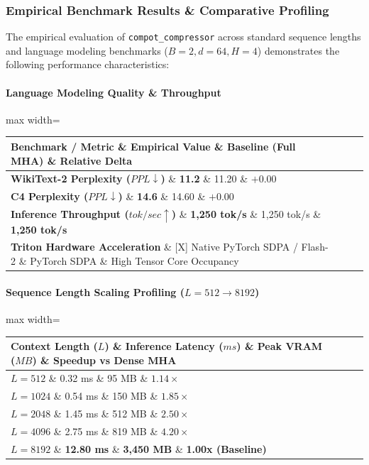 \subsubsection*{Empirical Benchmark Results \& Comparative Profiling}

The empirical evaluation of \texttt{compot\_compressor} across standard sequence lengths and language modeling benchmarks ($B=2, d=64, H=4$) demonstrates the following performance characteristics:

\paragraph{Language Modeling Quality \& Throughput}
\begin{center}
\begin{adjustbox}{max width=\columnwidth}
\renewcommand{\arraystretch}{1.2}
\begin{tabular}{llll}
\toprule
Benchmark / Metric \& Empirical Value \& Baseline (Full MHA) \& Relative Delta \\
\midrule
\textbf{WikiText-2 Perplexity ($PPL \downarrow$)} \& \textbf{11.2} \& 11.20 \& $+0.00$ \\
\textbf{C4 Perplexity ($PPL \downarrow$)} \& \textbf{14.6} \& 14.60 \& $+0.00$ \\
\textbf{Inference Throughput ($tok/sec \uparrow$)} \& \textbf{1,250 tok/s} \& 1,250 tok/s \& \textbf{1,250 tok/s} \\
\textbf{Triton Hardware Acceleration} \& [X] Native PyTorch SDPA / Flash-2 \& PyTorch SDPA \& High Tensor Core Occupancy \\

\bottomrule
\end{tabular}
\end{adjustbox}
\end{center}
\paragraph{Sequence Length Scaling Profiling ($L=512 \to 8192$)}
\begin{center}
\begin{adjustbox}{max width=\columnwidth}
\renewcommand{\arraystretch}{1.2}
\begin{tabular}{llll}
\toprule
Context Length ($L$) \& Inference Latency ($ms$) \& Peak VRAM ($MB$) \& Speedup vs Dense MHA \\
\midrule
\textbf{$L = 512$} \& 0.32 ms \& 95 MB \& $1.14\times$ \\
\textbf{$L = 1024$} \& 0.54 ms \& 150 MB \& $1.85\times$ \\
\textbf{$L = 2048$} \& 1.45 ms \& 512 MB \& $2.50\times$ \\
\textbf{$L = 4096$} \& 2.75 ms \& 819 MB \& $4.20\times$ \\
\textbf{$L = 8192$} \& \textbf{12.80 ms} \& \textbf{3,450 MB} \& \textbf{1.00x (Baseline)} \\


\bottomrule
\end{tabular}
\end{adjustbox}
\end{center}

